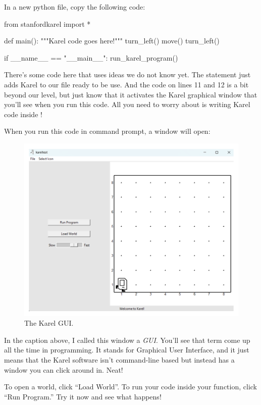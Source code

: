 \documentclass[12pt]{scrartcl}
\begin{document}
In a new python file, copy the following code:
\begin{python}
    from stanfordkarel import *


    def main():
        """Karel code goes here!"""
        turn_left()
        move()
        turn_left()


    if __name__ == "__main__":
        run_karel_program()
\end{python}

There's some code here that uses ideas we do not know yet. The statement  just adds Karel to our file ready to be use. And the code on lines 11 and 12 is a bit beyond our level, but just know that it activates the Karel graphical window that you'll see when you run this code. All you need to worry about is writing Karel code inside !

When you run this code in command prompt, a window will open:

\begin{figure}[H]
    \centering
    \includegraphics[scale=0.5]{Karel Window.png}
    \caption*{The Karel GUI.}
\end{figure}
In the caption above, I called this window a \textit{GUI}. You'll see that term come up all the time in programming. It stands for Graphical User Interface, and it just means that the Karel software isn't command-line based but instead has a window you can click around in. Neat!

To open a world, click ``Load World''. To run your code inside your  function, click ``Run Program.'' Try it now and see what happens!
\end{document}
